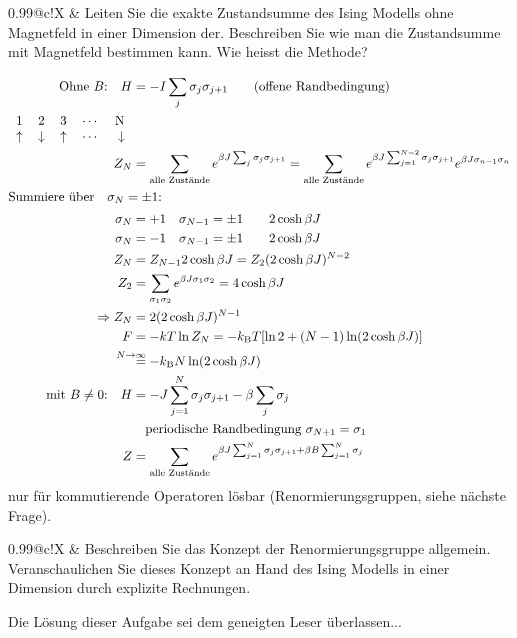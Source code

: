 \documentclass[a4paper,12pt]{scrartcl}
\makeatletter
\def\kB{k_\mathrm{B}}					%
\newcounter{qc}\setcounter{qc}{1}
\newenvironment{fshaded}{
\def\FrameCommand{\fcolorbox{framecolor}{shadecolor}}
\MakeFramed {\FrameRestore}}
{\endMakeFramed}
\def\frage#1{
\begin{fshaded}
\noindent
\begin{tabularx}{0.99\textwidth}{@{}c!{\color{framecolor}\vline}X}
{ \bf \rm \theqc }	&	\noindent #1
\end{tabularx}
\stepcounter{qc}
\end{fshaded}
}
\makeatother
\begin{document}
\frage{Leiten Sie die exakte Zustandsumme des Ising Modells ohne Magnetfeld in einer Dimension der. Beschreiben Sie wie man 
die Zustandsumme mit Magnetfeld bestimmen kann. Wie heisst die Methode?}
\noindent
\begin{align*}
	\text{Ohne $B$:}\quad H&=-I\sum_j\sigma_j\sigma_{j+1}\qquad\text{(offene Randbedingung)}\\
	\begin{tabular}{rrrrr}
		1&2&3&$\cdots$&N\\
		$\uparrow$&$\downarrow$&$\uparrow$&$\cdots$&$\downarrow$\\
	\end{tabular}
	\\Z_N&=\sum_{\text{alle Zustände}}e^{\beta J\sum_j\sigma_j\sigma_{j+1}}=\sum_{\text{alle Zustände}}e^{\beta 
J\sum_{j=1}^{N=2}\sigma_j\sigma_{j+1}}e^{\beta J\sigma_{n-1}\sigma_{n}}\\
	\intertext{Summiere über$\quad\sigma_N=\pm 1$:}
	\sigma_N&=+1\quad\sigma_{N-1}=\pm 1\qquad 2\cosh \beta J\\
	\sigma_N&=-1\quad\sigma_{N-1}=\pm 1\qquad 2\cosh \beta J\\
	Z_N&=Z_{N-1}2\cosh \beta J=Z_2(2\cosh\beta J)^{N-2}\\
	Z_2&=\sum_{\sigma_1\sigma_2}e^{\beta J \sigma_1\sigma_2}=4\cosh\beta J\\
	\Rightarrow Z_N&=2(2\cosh\beta J)^{N-1}\\
	F&=-kT\ln Z_N =-\kB T[\ln 2+(N-1)\ln (2\cosh\beta J)]\\&\stackrel{\hidewidth N\rightarrow\infty}{=}-\kB N\ln(2\cosh\beta J)\\
	\text{mit $B\neq0$:}\quad H&=-J\sum_{j=1}^N\sigma_j\sigma_{j+1}-\beta\sum_j\sigma_j\\
	&\quad \text{periodische Randbedingung 
$\sigma_{N+1}=\sigma_1$}\\
	Z&=\sum_{\text{alle Zustände}}e^{\beta J\sum_{j=1}^N\sigma_j\sigma_{j+1}+\beta B\sum_{j=1}^N\sigma_j}\\
\end{align*}
nur für kommutierende Operatoren lösbar (Renormierungsgruppen, siehe nächste Frage).

\frage{Beschreiben Sie das Konzept der Renormierungsgruppe allgemein. Veranschaulichen Sie dieses Konzept an Hand des Ising 
Modells in einer Dimension durch explizite Rechnungen.}
\noindent
Die Lösung dieser Aufgabe sei dem geneigten Leser überlassen...
\end{document}
